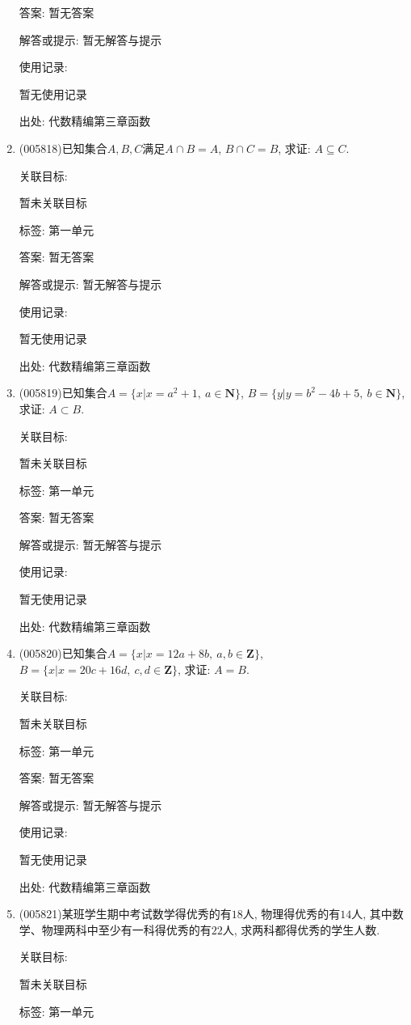 \documentclass[10pt,a4paper]{article}
\begin{document}
\begin{enumerate}[1.]
答案: 暂无答案

解答或提示: 暂无解答与提示

使用记录:

暂无使用记录


出处: 代数精编第三章函数
\item { (005818)}已知集合$A,B,C$满足$A\cap B=A$, $B\cap C=B$, 求证: $A\subseteq C$.


关联目标:

暂未关联目标



标签: 第一单元

答案: 暂无答案

解答或提示: 暂无解答与提示

使用记录:

暂无使用记录


出处: 代数精编第三章函数
\item { (005819)}已知集合$A=\{x|x=a^2+1,\ a\in \mathbf{N}\}$, $B=\{y|y=b^2-4b+5,\ b\in \mathbf{N}\}$, 求证: $A\subset B$.


关联目标:

暂未关联目标



标签: 第一单元

答案: 暂无答案

解答或提示: 暂无解答与提示

使用记录:

暂无使用记录


出处: 代数精编第三章函数
\item { (005820)}已知集合$A=\{x|x=12a+8b,\ a,b\in \mathbf{Z}\}$, $B=\{x|x=20c+16d,\ c,d\in \mathbf{Z}\}$, 求证: $A=B$.


关联目标:

暂未关联目标



标签: 第一单元

答案: 暂无答案

解答或提示: 暂无解答与提示

使用记录:

暂无使用记录


出处: 代数精编第三章函数
\item { (005821)}某班学生期中考试数学得优秀的有$18$人, 物理得优秀的有$14$人, 其中数学、物理两科中至少有一科得优秀的有$22$人, 求两科都得优秀的学生人数.


关联目标:

暂未关联目标



标签: 第一单元


\end{enumerate}
\end{document}
